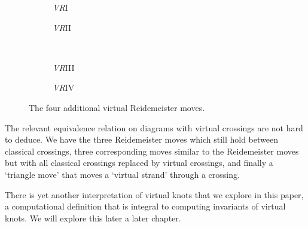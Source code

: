 \documentclass[12pt]{report}
\begin{document}
\begin{figure}[hbt]
	\centering
	\hspace*{\fill}
	\begin{subfigure}[b]{0.35 \textwidth}
		\centering
		\def\svgscale{0.22}
		
		\caption{\textit{VR}I}
	\end{subfigure}
	\hspace*{\fill}
	\begin{subfigure}[b]{0.35 \textwidth}
		\centering
		\def\svgscale{0.22}
		
		\caption{\textit{VR}II}
	\end{subfigure}
	\hspace*{\fill}
	\\
	\hspace*{\fill}
	\begin{subfigure}[b]{0.35 \textwidth}
		\centering
		\def\svgscale{0.22}
		
		\caption{\textit{VR}III}
	\end{subfigure}
	\hspace*{\fill}
	\begin{subfigure}[b]{0.35 \textwidth}
		\centering
		\def\svgscale{0.22}
		
		\caption{\textit{VR}IV}
	\end{subfigure}
	\hspace*{\fill}
	\caption{The four additional virtual Reidemeister moves.}
	\label{fig:virtual-reidemeister-moves}
\end{figure}

The relevant equivalence relation on diagrams with virtual crossings are not hard to deduce. We have the three Reidemeister moves which still hold between classical crossings, three corresponding moves similar to the Reidemeister moves but with all classical crossings replaced by virtual crossings, and finally a `triangle move' that moves a `virtual strand' through a crossing.

There is yet another interpretation of virtual knots that we explore in this paper, a computational definition that is integral to computing invariants of virtual knots. We will explore this later a later chapter.
\end{document}
